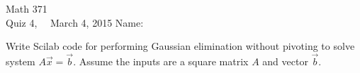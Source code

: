 \documentclass[addpoints, 11pt]{exam}
\begin{document}
Math 371 \\
Quiz 4, \ \ March 4, 2015
\hspace{2.in}
{Name:} {\underline {\hspace{2.15in}}} \\ \normalsize
\begin{questions}

\question Write Scilab code for performing Gaussian elimination without pivoting to solve system $A\vec{x}=\vec{b}$. Assume the inputs are a square matrix $A$ and vector $\vec{b}$.
\vfill

\end{questions}
\end{document}
